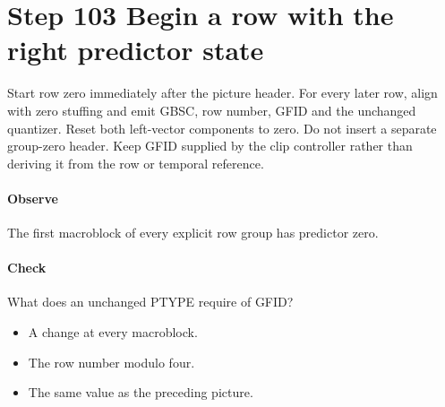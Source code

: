 \section{Step 103 Begin a row with the right predictor state}\label{h263-picture-s03}
Start row zero immediately after the picture header. For every later row, align
with zero stuffing and emit GBSC, row number, GFID and the unchanged quantizer.
Reset both left-vector components to zero. Do not insert a separate group-zero
header. Keep GFID supplied by the clip controller rather than deriving it from
the row or temporal reference.

\paragraph{Observe} The first macroblock of every explicit row group has predictor zero.
\paragraph{Check} What does an unchanged PTYPE require of GFID?
\begin{itemize}
  \item[A.] A change at every macroblock.
  \item[B.] The row number modulo four.
  \item[C.] The same value as the preceding picture.
\end{itemize}
